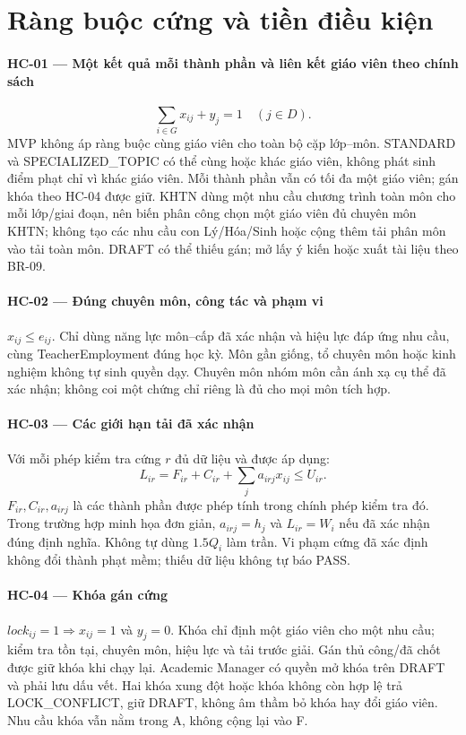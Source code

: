 \documentclass[12pt,a4paper]{report}
\begin{document}
\section{Ràng buộc cứng và tiền điều kiện}\label{sec:hard-constraints}
\paragraph{HC-01 --- Một kết quả mỗi thành phần và liên kết giáo viên theo chính sách}
\[
\sum_{i\in G}x_{ij}+y_j=1\quad(j\in D).
\]
MVP không áp ràng buộc cùng giáo viên cho toàn bộ cặp lớp--môn. STANDARD và SPECIALIZED\_TOPIC có thể cùng hoặc khác giáo viên, không phát sinh điểm phạt chỉ vì khác giáo viên. Mỗi thành phần vẫn có tối đa một giáo viên; gán khóa theo HC-04 được giữ.
KHTN dùng một nhu cầu chương trình toàn môn cho mỗi lớp/giai đoạn, nên biến phân công chọn một giáo viên đủ chuyên môn KHTN; không tạo các nhu cầu con Lý/Hóa/Sinh hoặc cộng thêm tải phân môn vào tải toàn môn. DRAFT có thể thiếu gán; mở lấy ý kiến hoặc xuất tài liệu theo BR-09.

\paragraph{HC-02 --- Đúng chuyên môn, công tác và phạm vi}
$x_{ij}\le e_{ij}$. Chỉ dùng năng lực môn--cấp đã xác nhận và hiệu lực đáp
ứng nhu cầu, cùng TeacherEmployment đúng học kỳ. Môn gần giống, tổ chuyên
môn hoặc kinh nghiệm không tự sinh quyền dạy. Chuyên môn nhóm môn cần ánh
xạ cụ thể đã xác nhận; không coi một chứng chỉ riêng là đủ cho mọi môn tích hợp.
\paragraph{HC-03 --- Các giới hạn tải đã xác nhận}
Với mỗi phép kiểm tra cứng $r$ đủ dữ liệu và được áp dụng:
\[
L_{ir}=F_{ir}+C_{ir}+\sum_j a_{irj}x_{ij}\le U_{ir}.
\]
$F_{ir},C_{ir},a_{irj}$ là các thành phần được phép tính trong chính phép
kiểm tra đó. Trong trường hợp minh họa đơn giản, $a_{irj}=h_j$ và $L_{ir}=W_i$ nếu đã
xác nhận đúng định nghĩa. Không tự dùng $1.5Q_i$ làm trần. Vi phạm cứng đã
xác định không đổi thành phạt mềm; thiếu dữ liệu không tự báo PASS.
\paragraph{HC-04 --- Khóa gán cứng}
$lock_{ij}=1\Rightarrow x_{ij}=1$ và $y_j=0$. Khóa chỉ định một giáo viên cho một nhu cầu; kiểm tra tồn tại, chuyên môn, hiệu lực và tải trước giải. Gán thủ công/đã chốt được giữ khóa khi chạy lại. Academic Manager có quyền mở khóa trên DRAFT và phải lưu dấu vết. Hai khóa xung đột hoặc khóa không còn hợp lệ trả LOCK\_CONFLICT, giữ DRAFT, không âm thầm bỏ khóa hay đổi giáo viên. Nhu cầu khóa vẫn nằm trong A, không cộng lại vào F.
\end{document}
